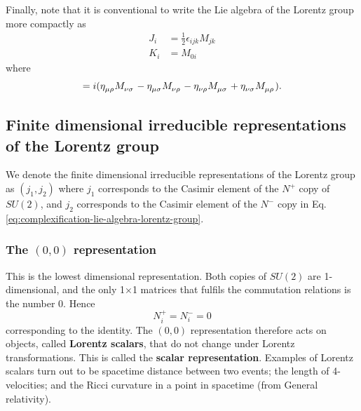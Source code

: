 \documentclass[11pt]{article}
\numberwithin{equation}{section}
\newcommand{\tn}[2]{\tensor{#1}{#2}}
\begin{document}
Finally, note that it is conventional to write the Lie algebra of the Lorentz group more compactly as 
\begin{align}
J_i &= \frac{1}{2} \epsilon_{ijk} M_{jk} \label{eq:defn-compact-lorentz-lie-algebra-notation} \\
K_i &= M_{0i} 
\end{align}
where
\begin{equation}
[\tn{M}{_\mu_\nu},\tn{M}{_\rho_\sigma}] = i(\tn{\eta}{_\mu _\rho} \tn{M}{_\nu _\sigma} - \tn{\eta}{_\mu _\sigma} \tn{M}{_\nu _\rho} - \tn{\eta}{_\nu _\rho} \tn{M}{_\mu _\sigma} + \tn{\eta}{_\nu _\sigma} \tn{M}{_\mu _\rho}). \label{eq:lorentz-algebra}
\end{equation}

\subsection{Finite dimensional irreducible representations of the Lorentz group}
We denote the finite dimensional irreducible representations of the Lorentz group as $(j_1, j_2)$ where $j_1$ corresponds to the Casimir element of the $N^+$ copy of $SU(2)$, and $j_2$ corresponds to the Casimir element of the $N^-$ copy in Eq.\eqref{eq:complexification-lie-algebra-lorentz-group}.

\subsubsection{The $(0,0)$ representation}
This is the lowest dimensional representation. Both copies of $SU(2)$ are 1-dimensional, and the only 1$\times$1 matrices that fulfils the commutation relations is the number 0. Hence
\begin{equation}
N_i^+ = N_i^- = 0
\end{equation}
corresponding to the identity. The $(0,0)$ representation therefore acts on objects, called \textbf{Lorentz scalars}, that do not change under Lorentz transformations. This is called the \textbf{scalar representation}. Examples of Lorentz scalars turn out to be spacetime distance between two events; the length of 4-velocities; and the Ricci curvature in a point in spacetime (from General relativity). 
\end{document}
